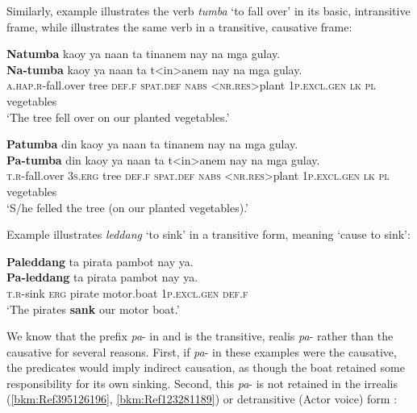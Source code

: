 Similarly, example  illustrates the verb \textit{tumba} ‘to fall over’ in its basic, intransitive frame, while  illustrates the same verb in a transitive, causative frame:

\ea
\label{bkm:Ref398385527}
\textbf{Natumba}  kaoy  ya  naan  ta  tinanem nay  na  mga  gulay. \\\smallskip
\gll \textbf{Na-tumba}  kaoy  ya  naan  ta  t<in>anem nay  na  mga  gulay. \\
\textsc{a.hap.r}-fall.over  tree  \textsc{def.f}  \textsc{spat.def}  \textsc{nabs}  <\textsc{nr.res}>plant
1\textsc{p.excl.gen}  \textsc{lk}  \textsc{pl}  vegetables \\
\glt ‘The tree fell over on our planted vegetables.’ 
\z

\ea
\label{bkm:Ref398385530}
\textbf{Patumba}  din  kaoy  ya  naan  ta  tinanem nay  na  mga  gulay. \\\smallskip
\gll \textbf{Pa-tumba}  din  kaoy  ya  naan  ta  t<in>anem nay  na  mga  gulay. \\
\textsc{t.r}-fall.over  3\textsc{s.erg}  tree  \textsc{def.f}  \textsc{spat.def}  \textsc{nabs}  <\textsc{nr.res}>plant
1\textsc{p.excl.gen}  \textsc{lk}  \textsc{pl}  vegetables \\
\glt ‘S/he felled the tree (on our planted vegetables).’
\z

Example  illustrates \textit{leddang} ‘to sink’ in a transitive form, meaning ‘cause to sink’: 

\ea
\label{bkm:Ref119509106}
\textbf{Paleddang}  ta  pirata  pambot  nay  ya. \\\smallskip
\gll \textbf{Pa-leddang}  ta  pirata  pambot  nay  ya. \\
\textsc{t.r}-sink  \textsc{erg}  pirate  motor.boat  1\textsc{p.excl.gen}  \textsc{def.f} \\
\glt ‘The pirates \textbf{sank} our motor boat.’
\z

We know that the prefix \textit{pa}{}- in   and  is the transitive, realis \textit{pa}{}- rather than the causative for several reasons. First, if \textit{pa}{}- in these examples were the causative, the predicates would imply indirect causation, as though the boat retained some responsibility for its own sinking. Second, this \textit{pa}{}- is not retained in the irrealis (\ref{bkm:Ref395126196}, \ref{bkm:Ref123281189}) or detransitive (Actor voice) form :


